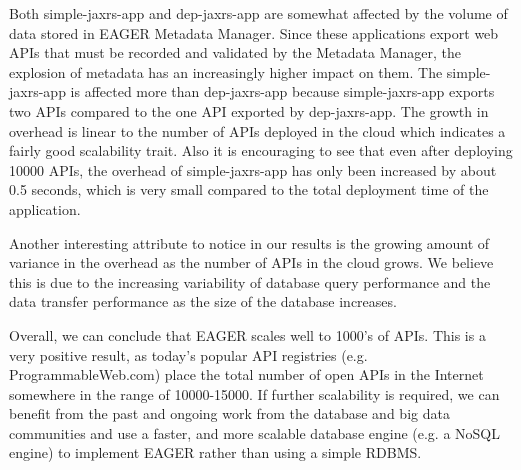 Both simple-jaxrs-app and dep-jaxrs-app are
somewhat affected by the volume of data stored in EAGER Metadata Manager. Since these applications export web APIs that must be 
recorded and validated by the Metadata Manager, the explosion of metadata has an increasingly higher impact on them. The simple-jaxrs-app
is affected more than dep-jaxrs-app because simple-jaxrs-app exports two APIs compared to the one API exported by dep-jaxrs-app. The growth
in overhead is linear to the number of APIs deployed in the cloud which indicates a fairly good scalability trait. Also it is encouraging to see that
even after deploying 10000 APIs, the overhead of simple-jaxrs-app has only been increased by about 0.5 seconds, which is very small compared
to the total deployment time of the application.

Another interesting attribute to notice in our results is the growing amount of variance in the overhead as the number of APIs in the cloud grows.
We believe this is due to the increasing variability of database query performance and the data transfer performance as the size of the 
database increases.

Overall, we can conclude that EAGER scales well to 1000's of APIs. This is a very positive result, as today's popular API registries (e.g. ProgrammableWeb.com) 
place the total number of open APIs in the Internet somewhere in the range of 10000-15000. If further scalability is required, we can benefit from the past and ongoing
work from the database and big data communities and use a faster, and more scalable database engine (e.g. a NoSQL engine) to implement 
EAGER rather than using a simple RDBMS.
